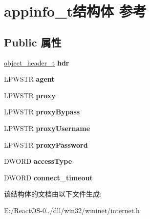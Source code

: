 \hypertarget{structappinfo__t}{}\section{appinfo\+\_\+t结构体 参考}
\label{structappinfo__t}
\subsection*{Public 属性}
\begin{DoxyCompactItemize}
\item 
\mbox{\label{structappinfo__t_acf8130ae105920d77405ea50b8c60633}} 
\hyperlink{struct__object__header__t}{object\+\_\+header\+\_\+t} {\bfseries hdr}
\item 
\mbox{\label{structappinfo__t_ab36d165ceffcacad88226138b00bd76a}} 
L\+P\+W\+S\+TR {\bfseries agent}
\item 
\mbox{\label{structappinfo__t_a022d79f2b54e80a0e3cd57cf1bab31ee}} 
L\+P\+W\+S\+TR {\bfseries proxy}
\item 
\mbox{\label{structappinfo__t_a09670f26ed036c562eb8092f56c8783a}} 
L\+P\+W\+S\+TR {\bfseries proxy\+Bypass}
\item 
\mbox{\label{structappinfo__t_ad76d108d0ee22bf99f76539adf5b08e7}} 
L\+P\+W\+S\+TR {\bfseries proxy\+Username}
\item 
\mbox{\label{structappinfo__t_ace97dc46f4980bfea5356f0db549ac69}} 
L\+P\+W\+S\+TR {\bfseries proxy\+Password}
\item 
\mbox{\label{structappinfo__t_a8ec4d51abec0966a7a999a80a7d3a142}} 
D\+W\+O\+RD {\bfseries access\+Type}
\item 
\mbox{\label{structappinfo__t_a96658292675c182bef493bd5a7a03926}} 
D\+W\+O\+RD {\bfseries connect\+\_\+timeout}
\end{DoxyCompactItemize}


该结构体的文档由以下文件生成\+:\begin{DoxyCompactItemize}
\item 
E\+:/\+React\+O\+S-\/0../dll/win32/wininet/internet.\+h\end{DoxyCompactItemize}
